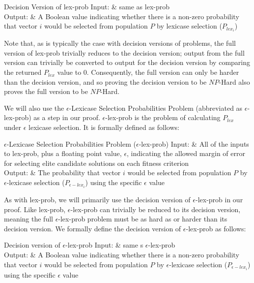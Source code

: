 \documentclass[sigconf]{acmart}
\begin{document}
\begin{problem}[ruled]{Decision Version of lex-prob}
  Input: & same as {\sc lex-prob}\\
  Output: & A Boolean value indicating whether there is a non-zero probability that vector $i$ would be selected from population $P$ by lexicase selection ($P_{lex_i}$)\\
\end{problem}

Note that, as is typically the case with decision versions of problems, the full version of {\sc lex-prob} trivially reduces to the decision version; output from the full version can trivially be converted to output for the decision version by comparing the returned $P_{lex}$ value to 0. Consequently, the full version can only be harder than the decision version, and so proving the decision version to be $NP$-Hard also proves the full version to be $NP$-Hard.

We will also use the $\epsilon$-Lexicase Selection Probabilities Problem (abbreviated as {\sc $\epsilon$-lex-prob}) as a step in our proof. {\sc $\epsilon$-lex-prob} is the problem of calculating $P_{lex}$ under $\epsilon$ lexicase selection. It is formally defined as follows:

\begin{problem}[ruled]{$\epsilon$-Lexicase Selection Probabilities Problem ($\epsilon$-lex-prob)}
  Input: & All of the inputs to {\sc lex-prob}, plus a floating point value, $\epsilon$, indicating the allowed margin of error for selecting elite candidate solutions on each fitness criterion\\
  Output: & The probability that vector $i$ would be selected from population $P$ by $\epsilon$-lexicase selection ($P_{\epsilon-lex_i}$) using the specific $\epsilon$ value\\
\end{problem}

As with {\sc lex-prob}, we will primarily use the decision version of {\sc $\epsilon$-lex-prob} in our proof. Like {\sc lex-prob}, {\sc $\epsilon$-lex-prob} can trivially be reduced to its decision version, meaning the full {\sc $\epsilon$-lex-prob} problem must be as hard as or harder than its decision version. We formally define the decision version of {\sc $\epsilon$-lex-prob} as follows:

\begin{problem}[ruled]{Decision version of $\epsilon$-lex-prob}
  Input: & same s {\sc $\epsilon$-lex-prob}\\
  Output: & A Boolean value indicating whether there is a non-zero probability that vector $i$ would be selected from population $P$ by $\epsilon$-lexicase selection ($P_{\epsilon-lex_i}$) using the specific $\epsilon$ value\\
\end{problem}
\end{document}
